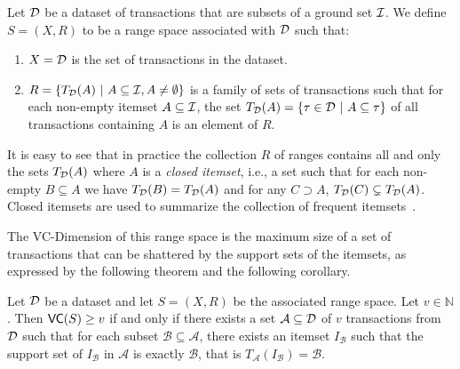 \begin{definition}
  Let ${\cal D}$ be a dataset of transactions that are subsets of a ground set
  ${\cal I}$.  We define $S=(X,R)$ to be a range space associated with ${\cal D}$ such
  that:
  \begin{enumerate}
    \item $X={\cal D}$ is the set of transactions in the dataset.
    \item $R=\{T_{\cal D}(A) ~|~ A\subseteq {\cal I}, A\neq\emptyset\}$ is a family of
      sets of transactions such that for each non-empty itemset
      $A\subseteq{\cal I}$, the set $T_{\cal D}(A)=\{\tau\in{\cal D} ~|~ A\subseteq\tau\}$ of
      all transactions containing $A$ is an element of $R$.
  \end{enumerate}
\end{definition}

It is easy to see that in practice the collection $R$ of ranges contains all and only
the sets $T_{\cal D}(A)$ where $A$ is a \emph{closed itemset}, i.e., a set such that
for each non-empty $B\subseteq A$ we have $T_{\cal D}(B)=T_{\cal D}(A)$ and for any
$C\supset A$, $T_{\cal D}(C)\subsetneq T_{\cal D}(A)$. Closed itemsets are used to
summarize the collection of frequent itemsets~\cite{CaldersRB06}.

The VC-Dimension of this range space is the maximum size of a set of
transactions that can be shattered by the support sets of the itemsets, as
expressed by the following theorem and the following corollary.

\begin{theorem}
  Let ${\cal D}$ be a dataset and let $S=(X,R)$ be the associated range
  space. Let $v\in\mathbb{N}$. Then $\mathsf{VC}(S)\ge v$ if and only if there exists a
  set $\mathcal{A}\subseteq{\cal D}$ of $v$ transactions from ${\cal D}$ such that for
  each subset $\mathcal{B}\subseteq\mathcal{A}$, there exists an itemset
  $I_\mathcal{B}$ such that the support set
  of $I_\mathcal{B}$ in $\mathcal{A}$ is exactly $\mathcal{B}$, that is
  $T_\mathcal{A}(I_\mathcal{B})=\mathcal{B}$.
\end{theorem}

